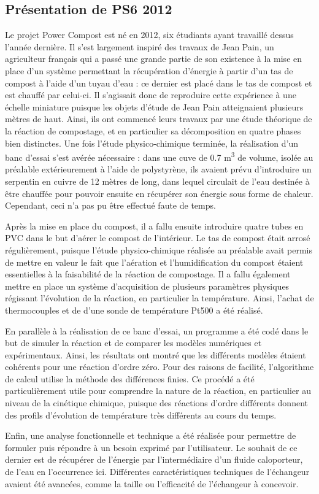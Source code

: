 \documentclass[../PS6_RapportFinal.tex]{subfiles}
\begin{document}
\graphicspath{{img/}{tex/img/}}
\subsection{Présentation de PS6 2012}
\label{presentationPS6}
Le projet \og Power Compost \fg{} est né en 2012, six étudiants ayant travaillé dessus l'année dernière. Il s'est largement inspiré des travaux de Jean Pain, un agriculteur français qui a passé une grande partie de son existence à la mise en place d'un système permettant la récupération d'énergie à partir d'un tas de compost à l'aide d'un tuyau d'eau : ce dernier est placé dans le tas de compost et est chauffé par celui-ci. Il s'agissait donc de reproduire cette expérience à une échelle miniature puisque les objets d'étude de Jean Pain atteignaient plusieurs mètres de haut. Ainsi, ils ont commencé leurs travaux par une étude théorique de la réaction de compostage, et en particulier sa décomposition en quatre phases bien distinctes. Une fois l'étude physico-chimique terminée, la réalisation d'un banc d'essai s'est avérée nécessaire : dans une cuve de \num{0.7} \si{\cubic\metre} de volume, isolée au préalable extérieurement à l'aide de polystyrène, ils avaient prévu d'introduire un serpentin en cuivre de 12 mètres de long, dans lequel circulait de l'eau destinée à être chauffée pour pouvoir ensuite en récupérer son énergie sous forme de chaleur. Cependant, ceci n'a pas pu être effectué faute de temps.

Après la mise en place du compost, il a fallu ensuite introduire quatre tubes en PVC dans le but d'aérer le compost de l'intérieur. Le tas de compost était arrosé régulièrement, puisque l'étude physico-chimique réalisée au préalable avait permis de mettre en valeur le fait que l'aération et l'humidification du compost étaient essentielles à la faisabilité de la réaction de compostage.
Il a fallu également mettre en place un système d'acquisition de plusieurs paramètres physiques régissant l'évolution de la réaction, en particulier la température. Ainsi, l'achat de thermocouples et de d'une sonde de température Pt500 a été réalisé.


En parallèle à la réalisation de ce banc d'essai, un programme a été codé dans le but de simuler la réaction et de comparer les modèles numériques et expérimentaux. Ainsi, les résultats ont montré que les différents modèles étaient cohérents pour une réaction d'ordre zéro. Pour des raisons de facilité, l'algorithme de calcul utilise la méthode des différences finies. Ce procédé a été particulièrement utile pour comprendre la nature de la réaction, en particulier au niveau de la cinétique chimique, puisque des réactions d'ordre différents donnent des profils d'évolution de température très différents au cours du temps.

Enfin, une analyse fonctionnelle et technique a été réalisée pour permettre de formuler puis répondre à un besoin exprimé par l'utilisateur. Le souhait de ce dernier est de récupérer de l'énergie par l'intermédiaire d'un fluide caloporteur, de l'eau en l'occurrence ici. Différentes caractéristiques techniques de l'échangeur avaient été avancées, comme la taille ou l'efficacité de l'échangeur à concevoir.
\end{document}
